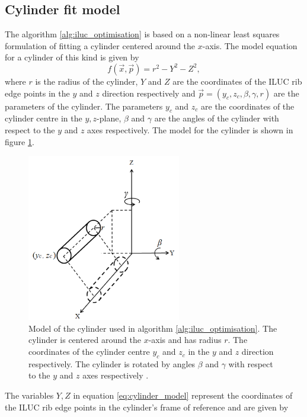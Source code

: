 \subsection{Cylinder fit model}
The algorithm \ref{alg:iluc_optimisation} is based on a non-linear least squares formulation of fitting a cylinder centered around the $x$-axis. The model equation for a cylinder of this kind is given by
\begin{equation}
    f(\vec{x},\vec{p}) = r^2 - Y^2 - Z^2,
    \label{eq:cylinder_model}
\end{equation}
where $r$ is the radius of the cylinder, $Y$ and $Z$ are the coordinates of the ILUC rib edge points in the $y$ and $z$ direction respectively and $\vec{p} = (y_c, z_c, \beta, \gamma, r)$ are the parameters of the cylinder. The parameters $y_c$ and $z_c$ are the coordinates of the cylinder centre in the $y,z$-plane, $\beta$ and $\gamma$ are the angles of the cylinder with respect to the $y$ and $z$ axes respectively. The model for the cylinder is shown in figure \ref{fig:cylinder_model}.
\begin{figure}[H]
    \centering
    \includegraphics[width=0.6\textwidth]{images/cylinder_model.png}
    \caption{Model of the cylinder used in algorithm \ref{alg:iluc_optimisation}. The cylinder is centered around the $x$-axis and has radius $r$. The coordinates of the cylinder centre $y_c$ and $z_c$ in the $y$ and $z$ direction respectively. The cylinder is rotated by angles $\beta$ and $\gamma$ with respect to the $y$ and $z$ axes respectively \cite[figure 2]{cylinder_fit}.}
    \label{fig:cylinder_model}
\end{figure}
The variables $Y,Z$ in equation \ref{eq:cylinder_model} represent the coordinates of the ILUC rib edge points in the cylinder's frame of reference and are given by
